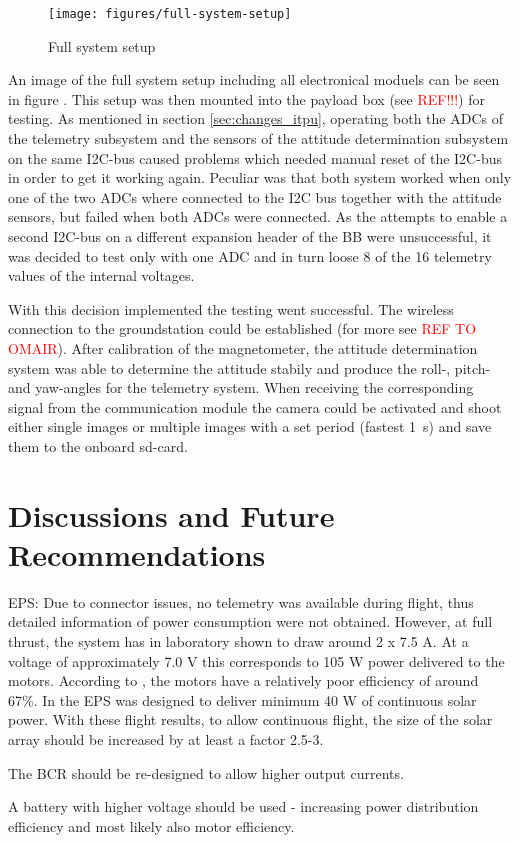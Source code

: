 \begin{figure}
\centering
\texttt{[image: figures/full-system-setup]}
\caption{Full system setup}
\label{fig:FlightTest1_1}
\end{figure}

An image of the full system setup including all electronical moduels can be seen in figure . This setup was then mounted into the payload box (see \textcolor{red}{REF!!!}) for testing. As mentioned in section \ref{sec:changes_itpu}, operating both the ADCs of the telemetry subsystem and the sensors of the attitude determination subsystem on the same I2C-bus caused problems which needed manual reset of the I2C-bus in order to get it working again. Peculiar was that both system worked when only one of the two ADCs where connected to the I2C bus together with the attitude sensors, but failed when both ADCs were connected. As the attempts to enable a second I2C-bus on a different expansion header of the BB were unsuccessful, it was decided to test only with one ADC and in turn loose 8 of the 16 telemetry values of the internal voltages. 

With this decision implemented the testing went successful. The wireless connection to the groundstation could be established (for more see \textcolor{red}{REF TO OMAIR}). After calibration of the magnetometer, the attitude determination system was able to determine the attitude stabily and produce the roll-, pitch- and yaw-angles for the telemetry system. When receiving the corresponding signal from the communication module the camera could be activated and shoot either single images or multiple images with a set period (fastest 1~s) and save them to the onboard sd-card.  

\section{Discussions and Future Recommendations}
%
EPS: Due to connector issues, no telemetry was available during flight, thus detailed information of power consumption were not obtained. However, at full thrust, the system has in laboratory shown to draw around 2 x 7.5 A. At a voltage of approximately 7.0 V this corresponds to 105 W power delivered to the motors. According to \cite{website:ModelMotors}, the motors have a relatively poor efficiency of around 67\%. In \cite{CDR} the \ac{EPS} was designed to deliver minimum 40 W of continuous solar power. With these flight results, to allow continuous flight, the size of the solar array should be increased by at least a factor 2.5-3.

The BCR should be re-designed to allow higher output currents. 

A battery with higher voltage should be used - increasing power distribution efficiency and most likely also motor efficiency.
